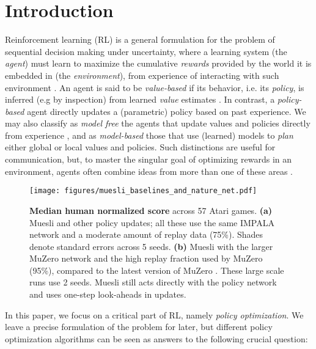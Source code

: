 \documentclass{article}
\begin{document}
\section{Introduction}
Reinforcement learning (RL) is a general formulation for the problem of sequential decision making under uncertainty, where a learning system (the \textit{agent}) must learn to maximize the cumulative \textit{rewards} provided by the world it is embedded in (the \textit{environment}), from experience of interacting with such environment \cite{sutton2018reinforcement}. An agent is said to be \textit{value-based} if its behavior, i.e. its \textit{policy}, is inferred (e.g by inspection) from learned \textit{value} estimates \cite{sutton1988, watkins1989, sarsa94, tesauro1995}. In contrast, a \textit{policy-based} agent directly updates a (parametric) policy \cite{williams1992,sutton2000} based on past experience. We may also classify as \textit{model free} the agents that update values and policies directly from experience \cite{sutton1988}, and as \textit{model-based} those that use (learned) models \cite{oh2015video,vanhasselt2019models} to \textit{plan} either global \citep{sutton1990dyna} or local \citep{richalet1978,kaelbling2010,silver2010} values and policies. Such distinctions are useful for communication, but, to master the singular goal of optimizing rewards in an environment, agents often combine ideas from more than one of these areas \cite{hessel2018, silver2016, schrittwieser2019}.

\begin{figure}[t]
\vskip -0.02in
\begin{center}
\centerline{\texttt{[image: figures/muesli\_baselines\_and\_nature\_net.pdf]}}
\vskip -0.16in
\caption{\textbf{Median human normalized score} across 57 Atari games. \textbf{(a)} Muesli and other policy updates; all these use the same IMPALA network and a moderate amount of replay data (75\%). Shades denote standard errors across 5 seeds. \textbf{(b)} Muesli with the larger MuZero network and the high replay fraction used by MuZero (95\%), compared to the latest version of MuZero \citep{schrittwieser2021offline}. These large scale runs use 2 seeds. Muesli still acts directly with the policy network and uses one-step look-aheads in updates. }
\label{fig:muesli_baselines_and_nature_net}
\end{center}
\vskip -0.31in
\end{figure}




In this paper, we focus on a critical part of RL, namely \textit{policy optimization}. We leave a precise formulation of the problem for later, but different policy optimization algorithms can be seen as answers to the following crucial question:
\end{document}
